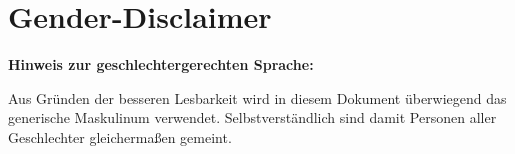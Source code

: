 
\section*{Gender-Disclaimer}

\textbf{Hinweis zur geschlechtergerechten Sprache:}

Aus Gründen der besseren Lesbarkeit wird in diesem Dokument überwiegend das generische Maskulinum verwendet. Selbstverständlich sind damit Personen aller Geschlechter gleichermaßen gemeint.
